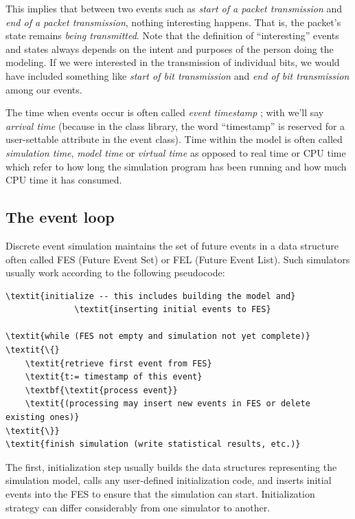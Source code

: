 This implies that between two events such as \textit{start of a packet
transmission} and \textit{end of a packet transmission}, nothing
interesting happens. That is, the packet's state remains \textit{being
transmitted}. Note that the definition of ``interesting'' events and states always
depends on the intent and purposes of the person doing the modeling.
If we were interested in the transmission of individual bits, we would
have included something like \textit{start of bit transmission} and
\textit{end of bit transmission} among our events.


The time when events occur is often called \textit{event timestamp}
; with {\opp} we'll say
\textit{arrival time} (because in the class
library, the word ``timestamp'' is reserved for a user-settable
attribute in the event class). Time within the model is often called
\textit{simulation time}, \textit{model time}
 or \textit{virtual time}
as opposed to real time or CPU time
which refer to how long the simulation program has been running and
how much CPU time it has consumed.



\subsection{The event loop}

Discrete event simulation maintains the set of future
events in a data structure often called
FES (Future Event Set) or FEL (Future Event List).
Such simulators usually work according to the following pseudocode:

\begin{Verbatim}[commandchars=\\\{\}]
\textit{initialize -- this includes building the model and}
              \textit{inserting initial events to FES}

\textit{while (FES not empty and simulation not yet complete)}
\textit{\{}
    \textit{retrieve first event from FES}
    \textit{t:= timestamp of this event}
    \textbf{\textit{process event}}
    \textit{(processing may insert new events in FES or delete existing ones)}
\textit{\}}
\textit{finish simulation (write statistical results, etc.)}
\end{Verbatim}


The first, initialization step usually builds the data structures
representing the simulation model, calls any user-defined
initialization code, and inserts initial events
into the FES to ensure that the simulation can start. Initialization
strategy can differ considerably from one simulator to another.


